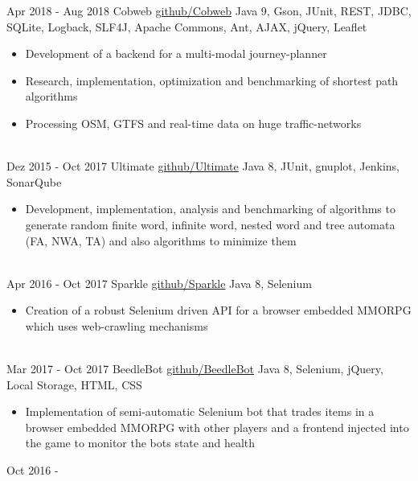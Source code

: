 \documentclass[letterpaper]{twentysecondcv} %
\begin{document}
\begin{twenty}
	\twentyitem
    		{Apr 2018 -}
		{Aug 2018}
        		{Cobweb}
        		{\href{https://github.com/Zabuzard/Cobweb}{github/Cobweb}}
        		{Java 9, Gson, JUnit, REST, JDBC, SQLite, Logback, SLF4J, Apache Commons, Ant, AJAX, jQuery, Leaflet}
        		{\begin{itemize}
        			\item Development of a backend for a multi-modal journey-planner
        			\item Research, implementation, optimization and benchmarking of shortest path algorithms
        			\item Processing OSM, GTFS and real-time data on huge traffic-networks
        		\end{itemize}}\\
	\twentyitem
    		{Dez 2015 -}
		{Oct 2017}
        		{Ultimate}
        		{\href{https://github.com/ultimate-pa/ultimate}{github/Ultimate}}
        		{Java 8, JUnit, gnuplot, Jenkins, SonarQube}
        		{\begin{itemize}
        			\item Development, implementation, analysis and benchmarking of algorithms to generate random finite word,
        			infinite word, nested word and tree automata (FA, NWA, TA) and also algorithms to minimize them
        		\end{itemize}}\\
	\twentyitem
    		{Apr 2016 -}
		{Oct 2017}
        		{Sparkle}
        		{\href{https://github.com/Zabuzard/Sparkle}{github/Sparkle}}
        		{Java 8, Selenium}
        		{\begin{itemize}
        			\item Creation of a robust Selenium driven API for a browser embedded MMORPG which uses web-crawling mechanisms
        		\end{itemize}}\\
	\twentyitem
    		{Mar 2017 -}
		{Oct 2017}
        		{BeedleBot}
        		{\href{https://github.com/Zabuzard/BeedleBot}{github/BeedleBot}}
        		{Java 8, Selenium, jQuery, Local Storage, HTML, CSS}
        		{\begin{itemize}
        			\item Implementation of semi-automatic Selenium bot that trades items in a browser embedded MMORPG
	        			with other players and a frontend injected into the game to monitor the bots state and health
        		\end{itemize}}
	\twentyitem
    		{Oct 2016 -}

\end{twenty}
\end{document}
